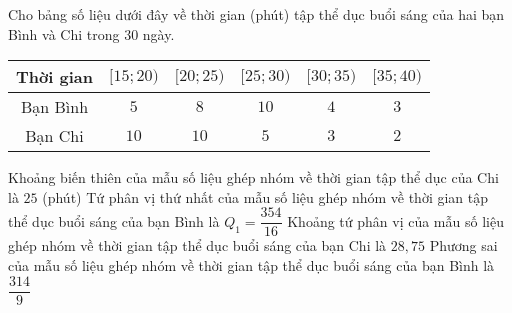 \begin{ex}%
 Cho bảng số liệu dưới đây về thời gian (phút) tập thể dục buổi sáng của hai bạn Bình và Chi trong $30$ ngày.
 \begin{center}
 \begin{tabular}{|c|c|c|c|c|c|}
 \hline
 Thời gian & $[15;20)$ & $[20;25)$ & $[25;30)$ & $[30;35)$ & $[35;40)$ \\
 \hline
 Bạn Bình & $5$ & $8$ & $10$ & $4$ & $3$ \\
 \hline
 Bạn Chi & $10$ & $10$ & $5$ & $3$ & $2$ \\
 \hline
 \end{tabular}
 \end{center}
 \choiceTF
 {\True Khoảng biến thiên của mẫu số liệu ghép nhóm về thời gian tập thể dục của Chi là $25$ (phút)}
 {Tứ phân vị thứ nhất của mẫu số liệu ghép nhóm về thời gian tập thể dục buổi sáng của bạn Bình là $Q_1=\dfrac{354}{16}$}
 {\True Khoảng tứ phân vị của mẫu số liệu ghép nhóm về thời gian tập thể dục buổi sáng của bạn Chi là $28{,}75$}
 {\True Phương sai của mẫu số liệu ghép nhóm về thời gian tập thể dục buổi sáng của bạn Bình là $\dfrac{314}{9}$} 
 \loigiai{
 Ta có \begin{center}
 \begin{tabular}{|c|c|c|c|c|c|}
 \hline
 Thời gian & $\left[15;20\right)$ & $\left[20;25\right)$ & $\left[25;30\right)$ & $\left[30;35\right)$ & $\left[35;40\right)$ \\
 \hline
 Giá trị đại diện & $17{,}5$ & $22{,}5$ & $27{,}5$ & $32{,}5$ & $37{,}5$ \\
 \hline
 Bạn Bình & $5$ & $8$ & $10$ & $10$ & $10$ \\
 \hline
 Bạn Chi & $10$ & $10$ & $5$ & $3$ & $2$ \\
 \hline
 \end{tabular}
 \end{center}
 
}
\end{ex}
